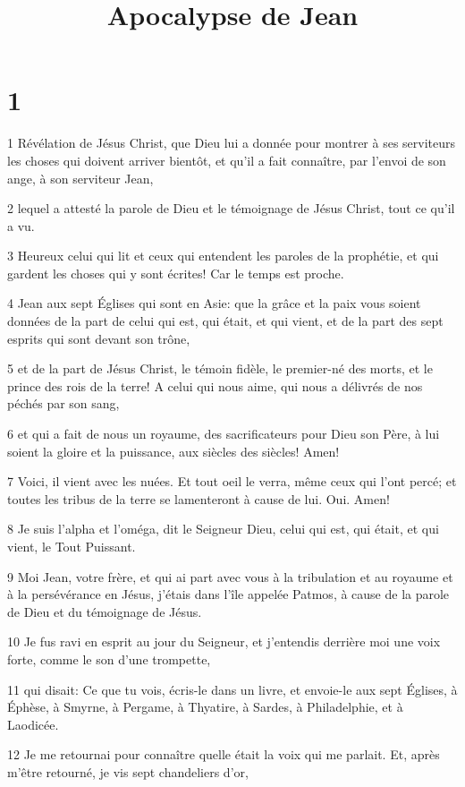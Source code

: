

\title{Apocalypse de Jean}


\chapter{1}

\par 1 Révélation de Jésus Christ, que Dieu lui a donnée pour montrer à ses serviteurs les choses qui doivent arriver bientôt, et qu'il a fait connaître, par l'envoi de son ange, à son serviteur Jean,
\par 2 lequel a attesté la parole de Dieu et le témoignage de Jésus Christ, tout ce qu'il a vu.
\par 3 Heureux celui qui lit et ceux qui entendent les paroles de la prophétie, et qui gardent les choses qui y sont écrites! Car le temps est proche.
\par 4 Jean aux sept Églises qui sont en Asie: que la grâce et la paix vous soient données de la part de celui qui est, qui était, et qui vient, et de la part des sept esprits qui sont devant son trône,
\par 5 et de la part de Jésus Christ, le témoin fidèle, le premier-né des morts, et le prince des rois de la terre! A celui qui nous aime, qui nous a délivrés de nos péchés par son sang,
\par 6 et qui a fait de nous un royaume, des sacrificateurs pour Dieu son Père, à lui soient la gloire et la puissance, aux siècles des siècles! Amen!
\par 7 Voici, il vient avec les nuées. Et tout oeil le verra, même ceux qui l'ont percé; et toutes les tribus de la terre se lamenteront à cause de lui. Oui. Amen!
\par 8 Je suis l'alpha et l'oméga, dit le Seigneur Dieu, celui qui est, qui était, et qui vient, le Tout Puissant.
\par 9 Moi Jean, votre frère, et qui ai part avec vous à la tribulation et au royaume et à la persévérance en Jésus, j'étais dans l'île appelée Patmos, à cause de la parole de Dieu et du témoignage de Jésus.
\par 10 Je fus ravi en esprit au jour du Seigneur, et j'entendis derrière moi une voix forte, comme le son d'une trompette,
\par 11 qui disait: Ce que tu vois, écris-le dans un livre, et envoie-le aux sept Églises, à Éphèse, à Smyrne, à Pergame, à Thyatire, à Sardes, à Philadelphie, et à Laodicée.
\par 12 Je me retournai pour connaître quelle était la voix qui me parlait. Et, après m'être retourné, je vis sept chandeliers d'or,
